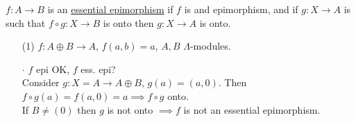 \begin{defin}
$f : A \to B$ is an \underline{essential epimorphism} if $f$ is and epimorphism, and if $g: X \to A$ is such that $f \circ g : X \to B$ is onto then $g: X \to A$ is onto.

\begin{exam}
\begin{enumerate}
\item[(1)] $f: A \oplus B \to A$, $f(a,b) = a$, $A, B$ $\Lambda$-modules.
\item[$\cdot$] $f$ epi OK, $f$ ess. epi?\\
Consider $g: X= A \to A \oplus B$, $g(a)=(a, 0)$. Then $f \circ g(a) = f(a,0)=a \implies f \circ g$ onto.\\
If $B \neq (0)$ then $g$ is not onto $\implies f$ is not an essential epimorphism.



\end{enumerate}
\end{exam}
\end{defin}
